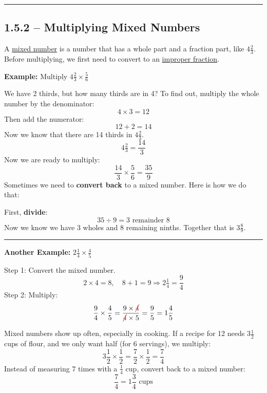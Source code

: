\documentclass[
  letterpaper,
  DIV=11,
  numbers=noendperiod]{scrreprt}
\begin{document}
\begin{center}\rule{0.5\linewidth}{0.5pt}\end{center}

\subsection*{1.5.2 -- Multiplying Mixed
Numbers}\label{multiplying-mixed-numbers}

A \href{./glossary.html\#glossary-mixed-number}{mixed number} is a
number that has a whole part and a fraction part, like
\(4\tfrac{2}{3}\). Before multiplying, we first need to convert to an
\href{./glossary.html\#glossary-improper-fraction}{improper fraction}.

\textbf{Example:} Multiply \(4\tfrac{2}{3} \times \frac{5}{6}\)

We have 2 thirds, but how many thirds are in 4? To find out, multiply
the whole number by the denominator: \[
4 \times 3 = 12
\] Then add the numerator: \[
12 + 2 = 14
\] Now we know that there are 14 thirds in \(4\tfrac{2}{3}\). \[
4\tfrac{2}{3} = \frac{14}{3}
\] Now we are ready to multiply: \[
\frac{14}{3} \times \frac{5}{6} = \frac{35}{9}
\] Sometimes we need to \textbf{convert back} to a mixed number. Here is
how we do that:

First, \textbf{divide}: \[
35 \div 9 = 3 \text{ remainder 8}
\] Now we know we have 3 wholes and 8 remaining ninths. Together that is
\(3 \tfrac{8}{9}\).

\begin{center}\rule{0.5\linewidth}{0.5pt}\end{center}

\textbf{Another Example:} \(2\tfrac{1}{4} \times \frac{4}{5}\)

Step 1: Convert the mixed number. \[
2 \times 4 = 8,\quad 8 + 1 = 9 \Rightarrow 2\tfrac{1}{4} = \frac{9}{4}
\] Step 2: Multiply: \[
\frac{9}{4} \times \frac{4}{5} = \frac{9 \times \cancel{\color{red}4}}{\cancel{\color{red}4} \times 5} = \frac{9}{5} = 1\frac{4}{5}
\]

Mixed numbers show up often, especially in cooking. If a recipe for 12
needs \(3 \frac{1}{2}\) cups of flour, and we only want half (for 6
servings), we multiply: \[
3 \frac{1}{2} \times \frac{1}{2} = \frac{7}{2} \times \frac{1}{2} = \frac{7}{4}
\] Instead of measuring 7 times with a \(\frac{1}{4}\) cup, convert back
to a mixed number: \[
\frac{7}{4} = 1\frac{3}{4} \text{ cups}
\]
\end{document}
